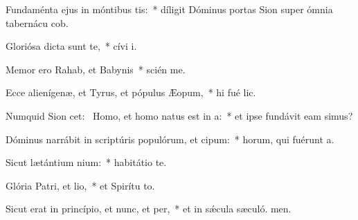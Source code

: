 \item Fundaménta ejus in móntibus tis:~* díligit Dóminus portas Sion super ómnia tabernácu cob.
\item Gloriósa dicta sunt  te,~* cívi i.
\item Memor ero Rahab, et Babynis~* scién me.
\item Ecce alienígenæ, et Tyrus, et pópulus Æopum,~* hi fué lic.
\item Numquid Sion cet:~\pscross{} Homo, et homo natus est in a:~* et ipse fundávit eam simus?
\item Dóminus narrábit in scriptúris populórum, et cipum:~* horum, qui fuérunt  a.
\item Sicut lætántium nium:~* habitátio   te.
\item Glória Patri, et lio,~* et Spirítu to.
\item Sicut erat in princípio, et nunc, et per,~* et in sǽcula sæculó. men.
